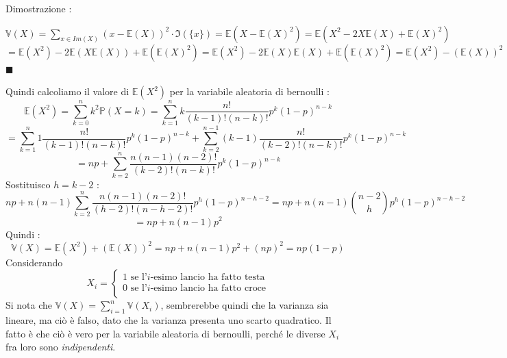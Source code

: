 \documentclass[12pt, letterpaper]{article}
\newcommand{\E}{{\mathbb E}}
\newcommand{\V}{{\mathbb V}}
\newcommand{\Prob}{{\mathbb P}}
\begin{document}
Dimostrazione :\begin{center}\(
    \V(X)=\displaystyle\sum_{x\in Im(X)}(x-\mathbb{E}(X))^2\cdot\Im(\{x\})  =\E(X-\E(X)^2)=\E(X^2-2X\E(X)+\E(X)^2)
\)\\\(
    =\E(X^2)-2\E(X\E(X))+\E(\E(X)^2)=\E(X^2)-2\E(X)\E(X)+\E(\E(X)^2)=\E(X^2)-(\E(X))^2\) \(\blacksquare\)
\end{center}
Quindi calcoliamo il valore di \(\E(X^2)\) per la variabile aleatoria di bernoulli :
\begin{equation}
    \E(X^2)=\sum_{k=0}^nk^2\Prob(X=k)=\sum_{k=1}^nk\dfrac{n!}{(k-1)!(n-k)!}p^k(1-p)^{n-k}
\end{equation}
\begin{equation}
    =\sum_{k=1}^n1\dfrac{n!}{(k-1)!(n-k)!}p^k(1-p)^{n-k}+\sum_{k=2}^{n-1}(k-1)\dfrac{n!}{(k-2)!(n-k)!}p^k(1-p)^{n-k}
\end{equation}\begin{equation}
    =np+\sum_{k=2}^n\dfrac{n(n-1)(n-2)!}{(k-2)!(n-k)!}p^k(1-p)^{n-k}
\end{equation}
Sostituisco \(h=k-2\) : \begin{equation}
    np+n(n-1)\sum_{k=2}^n\dfrac{n(n-1)(n-2)!}{(h-2)!(n-h-2)!}p^h(1-p)^{n-h-2}=np+n(n-1)\binom{n-2}{h}p^h(1-p)^{n-h-2}
\end{equation}
\begin{equation}
    =np+n(n-1)p^2
\end{equation}
Quindi :\begin{equation}
    \V(X)=\E(X^2)+(\E(X))^2=np+n(n-1)p^2+(np)^2=np(1-p)
\end{equation}
Considerando \begin{equation}
    X_i=\begin{cases}
        1 \text{ se l'}i\text{-esimo lancio ha fatto testa}\\
        0 \text{ se l'}i\text{-esimo lancio ha fatto croce}\\
    \end{cases}
\end{equation}
Si nota che \(\V(X)=\displaystyle\sum_{i=1}^n\V(X_i)\), sembrerebbe quindi che la varianza sia lineare, ma ciò 
è falso, dato che la varianza presenta uno scarto quadratico. Il fatto è che ciò è vero per la variabile
aleatoria di bernoulli, perché le diverse \(X_i\) fra loro sono \textit{indipendenti}.
\end{document}
